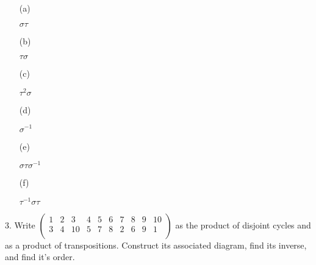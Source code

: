 \begin{mdframed}[style=darkAnswer,frametitle={Joe Starr}]
  \begin{itemize}
    \item [(a)]{$\sigma\tau$
      
    }
    \item [(b)]{$\tau\sigma$

    }
    \item [(c)]{$\tau^2\sigma$

    }
    \item [(d)]{$\sigma^{-1}$

    }
    \item [(e)]{$\sigma\tau\sigma^{-1}$

    }
    \item [(f)]{$\tau^{-1}\sigma\tau$

    }
  \end{itemize}
\end{mdframed}
\newpage
\begin{mdframed}[style=darkQuesion]
  3. Write 
    $\begin{pmatrix}
      1 & 2 & 3 & 4 & 5 & 6 & 7 & 8 & 9 & 10\\
      3 & 4 & 10 & 5 & 7 & 8 & 2 & 6 & 9 & 1\\
    \end{pmatrix}$ as the product of disjoint cycles and as a product of 
    transpositions. Construct its associated diagram, find its inverse, and find 
    it's order. 
\end{mdframed}
  
